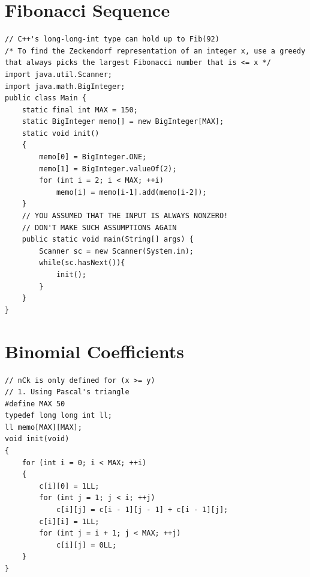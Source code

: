 \documentclass[12pt]{book}
\begin{document}
\section{Fibonacci Sequence}
\begin{verbatim}
// C++'s long-long-int type can hold up to Fib(92)
/* To find the Zeckendorf representation of an integer x, use a greedy
that always picks the largest Fibonacci number that is <= x */
import java.util.Scanner;
import java.math.BigInteger;
public class Main {
    static final int MAX = 150;
    static BigInteger memo[] = new BigInteger[MAX];
    static void init()
    {
        memo[0] = BigInteger.ONE;
        memo[1] = BigInteger.valueOf(2);
        for (int i = 2; i < MAX; ++i)
            memo[i] = memo[i-1].add(memo[i-2]);
    }
    // YOU ASSUMED THAT THE INPUT IS ALWAYS NONZERO!
    // DON'T MAKE SUCH ASSUMPTIONS AGAIN
    public static void main(String[] args) {
        Scanner sc = new Scanner(System.in);
        while(sc.hasNext()){
            init();
        }
    }    
}
\end{verbatim}
\section{Binomial Coefficients}
\begin{verbatim}
// nCk is only defined for (x >= y)
// 1. Using Pascal's triangle
#define MAX 50
typedef long long int ll;
ll memo[MAX][MAX];
void init(void)
{
	for (int i = 0; i < MAX; ++i)
	{
		c[i][0] = 1LL;
		for (int j = 1; j < i; ++j)
			c[i][j] = c[i - 1][j - 1] + c[i - 1][j];
		c[i][i] = 1LL;
		for (int j = i + 1; j < MAX; ++j)
			c[i][j] = 0LL;
	}
}
\end{verbatim}
\end{document}
